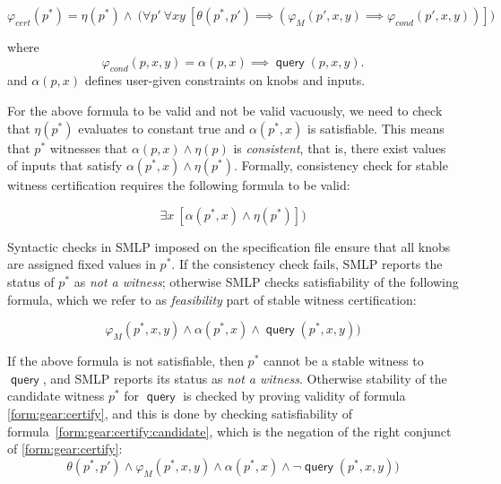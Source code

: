 \documentclass[a4paper,parskip=half]{article} %
\newcommand*\eqdef=
\newcommand*\query{\operatorname{\mathsf{query}}}
\begin{document}
\begin{equation}\label{form:gear:certify}
\varphi_{\mathit{cert}}(p^*) \eqdef
     \eta(p^*) \wedge ~\big(
    \forall p'~
    \forall x y~[
   \theta(p^*, p') \implies (\varphi_M(p',x,y)  \implies  \varphi_{\mathit{cond}}(p',x,y))
    ]\big)
\end{equation}

where \[\varphi_{\mathit{cond}}(p,x,y) \eqdef \alpha(p,x) \implies \query(p,x,y).\]
\noindent and  $\alpha(p,x)$ defines user-given constraints on knobs and inputs. 


For the above formula to be valid and not be valid vacuously, we need to check that $\eta(p^*)$ evaluates to constant true 
and  $\alpha(p^*,x)$ is satisfiable. This means that $p^*$ witnesses that $\alpha(p,x) \wedge \eta(p)$ is \emph{consistent}, 
that is, there exist values of inputs that satisfy  $\alpha(p^*,x) \wedge \eta(p^*)$. Formally, consistency check for stable 
witness certification requires the following formula to be valid: 

\begin{equation}\label{form:gear:certify:consistency}
\exists x~ [\alpha(p^*, x) \wedge \eta(p^*)])
\end{equation}


Syntactic checks in SMLP imposed on the specification file ensure that all knobs are assigned fixed values in $p^*$.  
If the consistency check fails, SMLP reports the status of $p^*$ as \emph{not a witness}; otherwise SMLP checks satisfiability 
of the following formula, which we refer to as \emph{feasibility} part of stable witness certification:

\begin{equation}\label{form:gear:certify:feasibility}
       \varphi_M(p^*,x,y)  \wedge  \alpha(p^*,x) \wedge   \query(p^*,x,y))
\end{equation}

If the above formula is not satisfiable, then $p^*$ cannot be a stable witness to $\query$, and SMLP reports its status as \emph{not a witness}. 
Otherwise stability of the candidate witness $p^*$ for $\query$ is checked by proving validity of formula \cref{form:gear:certify},
and this is done by checking satisfiability of formula~\cref{form:gear:certify:candidate}, which is the negation of the right conjunct of \cref{form:gear:certify}:
\begin{equation}\label{form:gear:certify:candidate}
     \theta(p^*, p')  \wedge  \varphi_M(p^*,x,y)  \wedge  \alpha(p^*,x) \wedge   \neg \query(p^*,x,y))
\end{equation}
\end{document}
